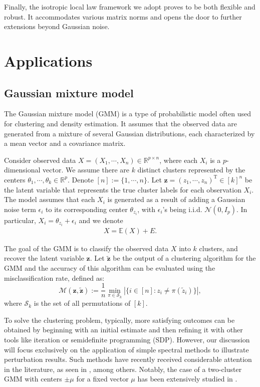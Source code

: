\documentclass[reqno]{amsart}
\newcommand{\E}{\mathbb{E}}
\newcommand{\T}{\mathrm{T}}
\theoremstyle{plain}
\theoremstyle{definition}
\begin{document}
Finally, the isotropic local law framework we adopt proves to be both flexible and robust. It accommodates various matrix norms and opens the door to further extensions beyond Gaussian noise.


\section{Applications}\label{sec:app}

\subsection{Gaussian mixture model}\label{sec:gmm}

The Gaussian mixture model (GMM) is a type of probabilistic model often used for clustering and density estimation. It assumes that the observed data are generated from a mixture of several Gaussian distributions, each characterized by a mean vector and a covariance matrix. 

Consider observed data $X=(X_1,\cdots,X_n) \in \mathbb R^{p\times n}$, where each $X_i$ is a $p$-dimensional vector. We assume there are $k$ distinct clusters represented by the centers $\theta_{1},\cdots, \theta_k \in \mathbb R^p$. Denote $[n]:=\{1,\cdots,n\}$. Let $\mathbf z=(z_1,\cdots,z_n)^\T \in [k]^n$ be the latent variable that represents the true cluster labels for each observation $X_i$. The model assumes that each $X_i$ is generated as a result of adding a Gaussian noise term $\epsilon_i$ to its corresponding center $\theta_{z_i}$, with $\epsilon_i$'s being i.i.d. $\mathcal N(0,I_p)$. In particular,  
$X_i = \theta_{z_i} + \epsilon_i$ and we denote 
\begin{align}\label{eq:gmm}
X=\E(X) + E.
\end{align}

The goal of the GMM is to classify the observed data $X$ into $k$ clusters, and recover the latent variable $\mathbf z$. Let $\widetilde{\mathbf z}$ be the output of a clustering algorithm for the GMM and the accuracy of this algorithm can be evaluated using the misclassification rate, defined as:
$$\mathcal M (\mathbf z, \widetilde{\mathbf z}):=\frac{1}{n} \min_{\pi \in \mathcal S_k} \left| \{ i\in [n]: z_i \neq \pi(\widetilde z_i)\} \right|,$$
where $\mathcal S_k$ is the set of all permutations of $[k]$.

To solve the clustering problem, typically, more satisfying outcomes can be obtained by beginning with an initial estimate and then refining it with other tools like iteration or semidefinite programming (SDP). However, our discussion will focus exclusively on the application of simple spectral methods to illustrate perturbation results. Such methods have recently received considerable attention in the literature, as seen in \cite{CZ18, AFW22, LZZ21, ZZ22}, among others. Notably, the case of a two-cluster GMM with centers $\pm \mu$ for a fixed vector $\mu$ has been extensively studied in \cite{CZ18, AFW22}.
\end{document}
